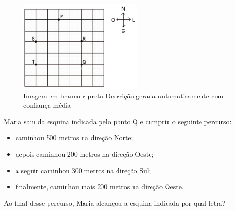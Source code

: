 \begin{escolha}
\begin{escolha}
\begin{escolha}
\begin{escolha}
{\begin{boxmedio}
\begin{boxpeq}
\begin{q°}
\begin{boxmedio}
\begin{boxpeq}
\begin{boxpeq}
\begin{boxmedio}
\begin{boxmedio}
\begin{boxmedio}
\begin{figure}
\centering
\includegraphics[width=2.4375in,height=1.82292in]{./_SAEB_9_MAT/media/image202.png}
\caption{Imagem em branco e preto Descrição gerada automaticamente com
confiança média}
\end{figure}


Maria saiu da esquina indicada pelo ponto Q e cumpriu o seguinte
percurso:

\begin{itemize}
  \item caminhou 500 metros na direção Norte;

  \item depois caminhou 200 metros na direção Oeste;
  
  \item a seguir caminhou 300 metros na direção Sul;
  
  \item finalmente, caminhou mais 200 metros na direção Oeste.
\end{itemize}

Ao final desse percurso, Maria alcançou a esquina indicada por qual letra?



\end{boxmedio}
\end{boxmedio}
\end{boxmedio}
\end{boxpeq}
\end{boxpeq}
\end{boxmedio}
\end{q°}
\end{boxpeq}
\end{boxmedio}}
\end{escolha}
\end{escolha}
\end{escolha}
\end{escolha}
